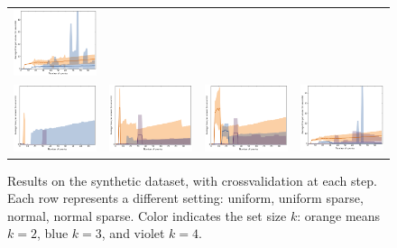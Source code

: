 \documentclass{article}
\renewcommand\[{\begin{equation}}
\renewcommand\]{\end{equation}}
\begin{document}
\begin{figure}[b]
\begin{tabular}{cccc}
        \includegraphics[width=12em]{figures/synthetic_6_normal_cv1_time}
        \\
        \includegraphics[width=12em]{figures/synthetic_3_normal_sparse_cv1_time} &
        \includegraphics[width=12em]{figures/synthetic_4_normal_sparse_cv1_time} &
        \includegraphics[width=12em]{figures/synthetic_5_normal_sparse_cv1_time} &
        \includegraphics[width=12em]{figures/synthetic_6_normal_sparse_cv1_time}
    \end{tabular}
    \caption{Results on the synthetic dataset, with crossvalidation at each step. Each row represents a different
    setting: uniform, uniform sparse, normal, normal sparse. Color indicates
    the set size $k$: orange means $k=2$, blue $k=3$, and violet $k=4$.}
\end{figure}
\end{document}
